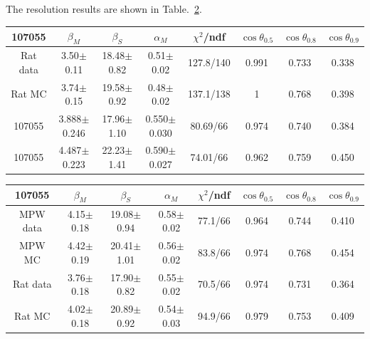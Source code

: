 The resolution results are shown in Table.~\ref{angularResolValuesUpdated}.
\begin{table}[ht]
	\begin{tabular}{cccccccc}%
		\toprule
		107055& $\beta_M$ &  $\beta_S$ & $\alpha_M$ & $\chi^2$/ndf & $\cos\theta_{0.5}$ & $\cos\theta_{0.8}$& $\cos\theta_{0.9}$\\
		\hline
		Rat data & 3.50$\pm$0.11 & 18.48$\pm$0.82 & 0.51$\pm$0.02 & 127.8/140 & 0.991 & 0.733 & 0.338\\
		Rat MC  & 3.74$\pm$0.15 & 19.58$\pm$0.92 & 0.48$\pm$0.02 & 137.1/138 & 1 & 0.768 & 0.398\\	
		\hline
107055 & 3.888$\pm$0.246 & 17.96$\pm$1.10 & 0.550$\pm$0.030 & 80.69/66 & 0.974 & 0.740 & 0.384\\
107055 & 4.487$\pm$0.223 & 22.23$\pm$1.41 & 0.590$\pm$0.027 & 74.01/66 & 0.962 & 0.759 & 0.450\\		
		\bottomrule
	\end{tabular}
	\label{angularResolValues}
\end{table}

\begin{table}[ht]
	\begin{tabular}{cccccccc}%
		\toprule
	107055& $\beta_M$ &  $\beta_S$ & $\alpha_M$ & $\chi^2$/ndf & $\cos\theta_{0.5}$ & $\cos\theta_{0.8}$& $\cos\theta_{0.9}$\\
	\hline
	MPW data & 4.15$\pm$0.18 & 19.08$\pm$0.94 & 0.58$\pm$0.02 & 77.1/66 & 0.964 & 0.744 & 0.410 \\
	MPW MC & 4.42$\pm$0.19 & 20.41$\pm$1.01 & 0.56$\pm$0.02 & 83.8/66 & 0.974 & 0.768 & 0.454	 \\	
\hline
	Rat data & 3.76$\pm$0.18 & 17.90$\pm$0.82 & 0.55$\pm$0.02 & 70.5/66 & 0.974 & 0.731 & 0.364 \\
	Rat MC & 4.02$\pm$0.18 & 20.89$\pm$0.92 & 0.54$\pm$0.03 & 94.9/66 & 0.979 & 0.753 & 0.409	\\
		\bottomrule
	\end{tabular}
	\label{angularResolValuesUpdated}
\end{table}

